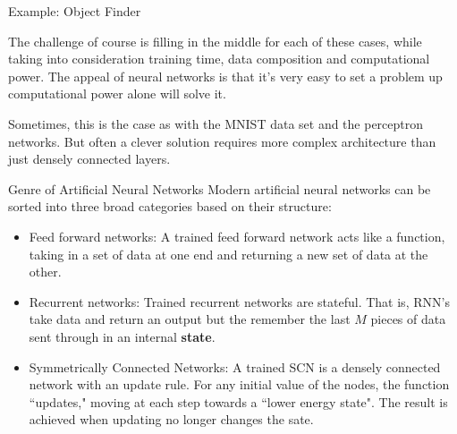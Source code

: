 \documentclass[10pt, table, dvipsnames,xcdraw, handout]{beamer}
\def\layersep{2.5cm}
\begin{document}
\begin{frame}[fragile]{Example: Object Finder}
\begin{minipage}[t][0.3\textheight][t]{\textwidth}
\begin{tikzpicture}[shorten >=1pt,->,draw=black!50, node distance=\layersep]
\end{tikzpicture}
  \end{minipage}
  \vfill
\begin{minipage}[t][0.7\textheight][t]{\textwidth}
The challenge of course is filling in the middle for each of these cases, while taking into consideration training time, data composition and computational power. The appeal of neural networks is that it's very easy to set a problem up computational power alone will solve it. 

Sometimes, this is the case as with the MNIST data set and the perceptron networks. But often a clever solution requires more complex architecture than just densely connected layers. 
\end{minipage}
\end{frame}




\begin{frame}[fragile]{Genre of Artificial Neural Networks}
Modern artificial neural networks can be sorted into three broad categories based on their structure:

\begin{itemize}
\item[] Feed forward networks: A trained feed forward network acts like a function, taking in a set of data at one end and returning a new set of data at the other.\pause

\item[] Recurrent networks: Trained recurrent networks are stateful. That is, RNN's take data and return an output but the remember the last $M$ pieces of data sent through in an internal \textbf{state}. \pause

\item[] Symmetrically Connected Networks: A trained SCN is a densely connected network with an update rule. For any initial value of the nodes, the function ``updates," moving at each step towards a ``lower energy state". The result is achieved when updating no longer changes the sate. 
\end{itemize}
\end{frame}
\end{document}
